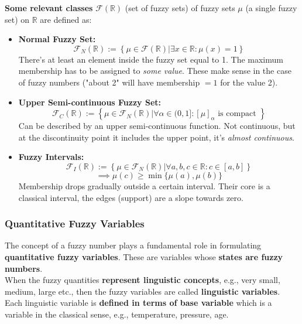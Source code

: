 \textbf{Some relevant classes} $\mathcal{F} (\mathbb{R})$ (set of fuzzy sets) of fuzzy sets $\mu$ (a single fuzzy set) on $\mathbb{R}$ are defined as: 
\begin{itemize}
	\item \textbf{Normal Fuzzy Set:}
	$$ \mathcal{F}_N (\mathbb{R}) := \left\{\mu \in \mathcal{F} (\mathbb{R}) | \exists x \in \mathbb{R}: \mu (x) = 1 \right\} $$
	There's at least an element inside the fuzzy set equal to 1. The maximum membership has to be assigned to \textit{some value}. These make sense in the case of fuzzy numbers ("about 2" will have membership $=1$ for the value 2).\\
	
	\item \textbf{Upper Semi-continuous Fuzzy Set:}
	$$ \mathcal{F}_C (\mathbb{R}) := \left\{\mu \in \mathcal{F}_N (\mathbb{R}) | \forall \alpha \in (0,1] : [\mu]_\alpha \text{ is compact } \right\} $$
	Can be described by an upper semi-continuous function. Not continuous, but at the discontinuity point it includes the upper point, it's \textit{almost continuous}.\\
	
	\item \textbf{Fuzzy Intervals:}
	$$ \mathcal{F}_I (\mathbb{R}) := \left\{\mu \in \mathcal{F}_N (\mathbb{R}) | \forall a,b,c \in \mathbb{R} : c \in [a,b] \right\}$$
	$$ \implies \mu(c) \geq \min\{\mu(a), \mu(b)\} $$
	Membership drops gradually outside a certain interval. Their core is a classical interval, the edges (support) are a slope towards zero.\\
\end{itemize}

\newpage

\subsubsection{Quantitative Fuzzy Variables}

The concept of a fuzzy number plays a fundamental role in formulating \textbf{quantitative fuzzy variables}. These are variables whose \textbf{states are fuzzy numbers}.\\

When the fuzzy quantities \textbf{represent linguistic concepts}, e.g., very small, medium, large etc., then the fuzzy variables are called \textbf{linguistic variables}. Each linguistic variable is \textbf{defined in terms of base variable} which is a variable in the classical sense, e.g., temperature, pressure, age.\\


